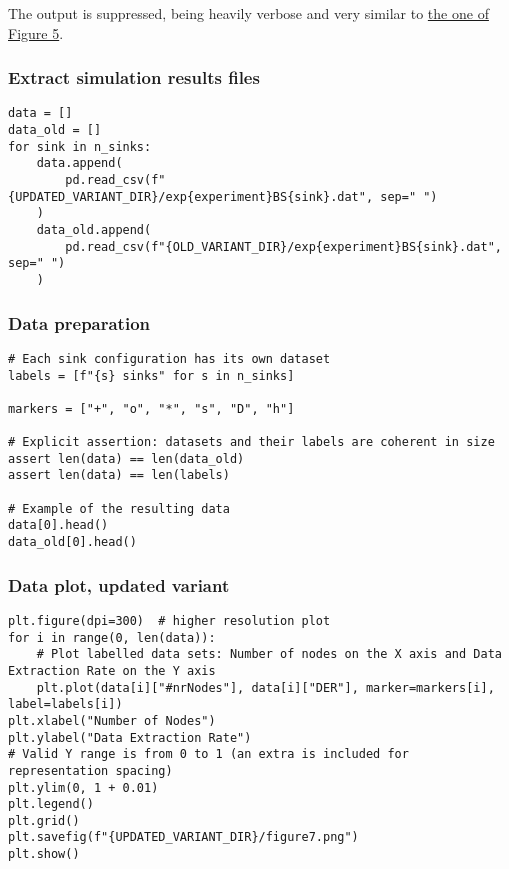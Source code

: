 \documentclass[a4paper,11pt]{article} %
\begin{document}
    The output is suppressed, being heavily verbose and very similar to \hyperref[output-fig5]{the one of Figure 5}.

    \subsubsection*{Extract simulation results files}

    \begin{verbatim}
data = []
data_old = []
for sink in n_sinks:
    data.append(
        pd.read_csv(f"{UPDATED_VARIANT_DIR}/exp{experiment}BS{sink}.dat", sep=" ")
    )
    data_old.append(
        pd.read_csv(f"{OLD_VARIANT_DIR}/exp{experiment}BS{sink}.dat", sep=" ")
    )
    \end{verbatim}

    \subsubsection*{Data preparation}

    \begin{verbatim}
# Each sink configuration has its own dataset
labels = [f"{s} sinks" for s in n_sinks]

markers = ["+", "o", "*", "s", "D", "h"]

# Explicit assertion: datasets and their labels are coherent in size
assert len(data) == len(data_old)
assert len(data) == len(labels)

# Example of the resulting data
data[0].head()
data_old[0].head()
    \end{verbatim}

    \subsubsection*{Data plot, updated variant}

    \begin{verbatim}
plt.figure(dpi=300)  # higher resolution plot
for i in range(0, len(data)):
    # Plot labelled data sets: Number of nodes on the X axis and Data Extraction Rate on the Y axis
    plt.plot(data[i]["#nrNodes"], data[i]["DER"], marker=markers[i], label=labels[i])
plt.xlabel("Number of Nodes")
plt.ylabel("Data Extraction Rate")
# Valid Y range is from 0 to 1 (an extra is included for representation spacing)
plt.ylim(0, 1 + 0.01)
plt.legend()
plt.grid()
plt.savefig(f"{UPDATED_VARIANT_DIR}/figure7.png")
plt.show()
    \end{verbatim}
\end{document}
